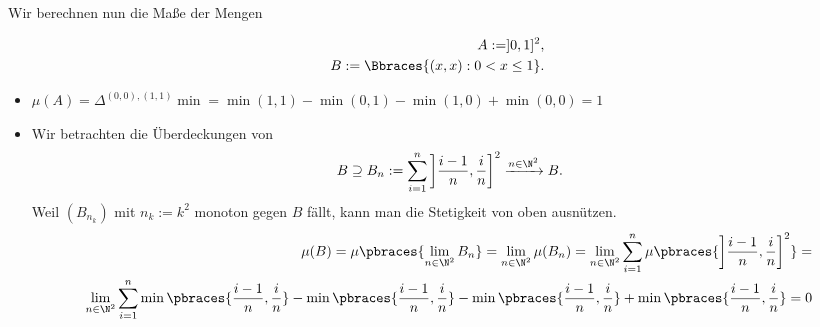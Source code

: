 \begin{solution}
Wir berechnen nun die Maße der Mengen

\begin{align*}
  A := ]0, 1]^2, \\
  B := \Bbraces{(x, x): 0 < x \leq 1}.
\end{align*}

\begin{itemize}

  \item $\mu(A) =
  \Delta^{(0, 0), (1, 1)} \min =
  \min(1, 1) - \min(0, 1) - \min(1, 0) + \min(0, 0) = 1$

  \item Wir betrachten die Überdeckungen von
  \begin{align*}
    B \supseteq B_n
    :=
    \sum_{i=1}^n
    \left ] \frac{i-1}{n}, \frac{i}{n} \right ]^2
    \xrightarrow{n \in \N^2} B.
  \end{align*}
  Weil $(B_{n_k})$ mit $n_k := k^2$ monoton gegen $B$ fällt, kann man die Stetigkeit von oben ausnützen.
  \begin{align*}
    \mu(B)
    =
    \mu \pbraces{\lim_{n \in \N^2} B_n}
    =
    \lim_{n \in \N^2} \mu(B_n)
    =
    \lim_{n \in \N^2} \sum_{i=1}^n \mu \pbraces
    {\left ] \frac{i-1}{n}, \frac{i}{n} \right ]^2}
    = \\
    \lim_{n \in \N^2} \sum_{i=1}^n
    \min \pbraces{\frac{i-1}{n}, \frac{i}{n}} -
    \min \pbraces{\frac{i-1}{n}, \frac{i}{n}} -
    \min \pbraces{\frac{i-1}{n}, \frac{i}{n}} +
    \min \pbraces{\frac{i-1}{n}, \frac{i}{n}}
    = 0
  \end{align*}

\end{itemize}

\end{solution}
